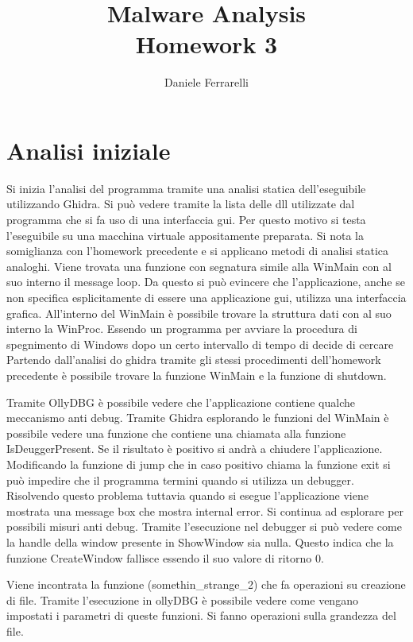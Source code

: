 \documentclass[a4paper,10pt]{article}
\title{Malware Analysis \\ \large Homework 3}
\author{Daniele Ferrarelli}
\date{}
\begin{document}
\maketitle

\section{Analisi iniziale}
Si inizia l'analisi del programma tramite una analisi statica dell'eseguibile utilizzando Ghidra. Si può vedere tramite la lista delle dll utilizzate dal programma che si fa uso di una interfaccia gui. Per questo motivo si testa l'eseguibile su una macchina virtuale appositamente preparata. Si nota la somiglianza con l'homework precedente e si applicano metodi di analisi statica analoghi. Viene trovata una funzione con segnatura simile alla WinMain con al suo interno il message loop. Da questo si può evincere che l'applicazione, anche se non specifica esplicitamente di essere una applicazione gui, utilizza una interfaccia grafica. All'interno del WinMain è possibile trovare la struttura dati con al suo interno la WinProc.
Essendo un programma per avviare la procedura di spegnimento di Windows dopo un certo intervallo di tempo di decide di cercare
Partendo dall'analisi do ghidra tramite gli stessi procedimenti dell'homework precedente è possibile trovare la funzione WinMain e la funzione di shutdown.

Tramite OllyDBG è possibile vedere che l'applicazione contiene qualche meccanismo anti debug. Tramite Ghidra esplorando le funzioni del WinMain è possibile vedere una funzione che contiene una chiamata alla funzione IsDeuggerPresent. Se il risultato è positivo si andrà a chiudere l'applicazione. Modificando la funzione di jump che in caso positivo chiama la funzione exit si può impedire che il programma termini quando si utilizza un debugger.
Risolvendo questo problema tuttavia quando si esegue l'applicazione viene mostrata una message box che mostra internal error. Si continua ad esplorare per possibili misuri anti debug. Tramite l'esecuzione nel debugger si può vedere come la handle della window presente in ShowWindow sia nulla. Questo indica che la funzione CreateWindow fallisce essendo il suo valore di ritorno 0.

Viene incontrata la funzione (somethin\_strange\_2) che fa operazioni su creazione di file. Tramite l'esecuzione in ollyDBG è possibile vedere come vengano impostati i parametri di queste funzioni. Si fanno operazioni sulla grandezza del file.
\end{document}
